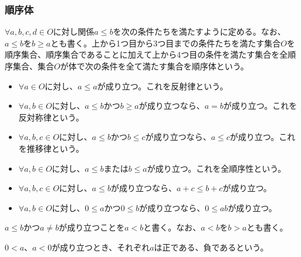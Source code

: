 \documentclass[dvipdfmx]{jsarticle}
\begin{document}
\subsubsection{順序体}%
\begin{axs}[順序体の公理]
$\forall a,b,c,d \in O$に対し関係$a \leq b$を次の条件たちを満たすように定める。なお、$a \leq b$を$b \geq a$とも書く。上から1つ目から3つ目までの条件たちを満たす集合$O$を順序集合、順序集合であることに加えて上から4つ目の条件を満たす集合を全順序集合、集合$O$が体で次の条件を全て満たす集合を順序体という。
\begin{itemize}
\item
  $\forall a \in O$に対し、$a \leq a$が成り立つ。これを反射律という。
\item
  $\forall a,b \in O$に対し、$a \leq b$かつ$b \geq a$が成り立つなら、$a = b$が成り立つ。これを反対称律という。
\item
  $\forall a,b,c \in O$に対し、$a \leq b$かつ$b \leq c$が成り立つなら、$a \leq c$が成り立つ。これを推移律という。
\item
  $\forall a,b \in O$に対し、$a \leq b$または$b \leq a$が成り立つ。これを全順序性という。
\item
  $\forall a,b,c \in O$に対し、$a \leq b$が成り立つなら、$a + c \leq b + c$が成り立つ。
\item
  $\forall a,b \in O$に対し、$0 \leq a$かつ$0 \leq b$が成り立つなら、$0 \leq ab$が成り立つ。
\end{itemize}
\end{axs}
\begin{dfn}
$a \leq b$かつ$a \neq b$が成り立つことを$a < b$と書く。なお、$a < b$を$b > a$とも書く。
\end{dfn}
\begin{dfn}
$0 < a$、$a < 0$が成り立つとき、それぞれ$a$は正である、負であるという。
\end{dfn}
\end{document}
